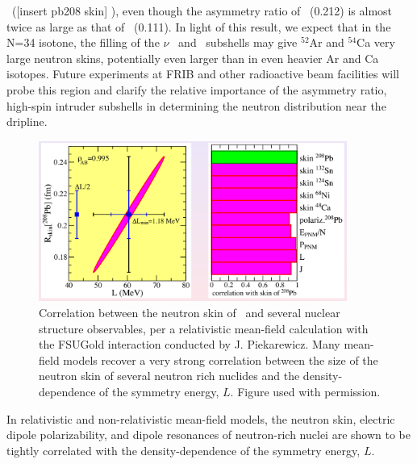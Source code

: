 \pbEight\ ([insert pb208 skin] \femto\meter), even though the asymmetry ratio of \pbEight\
(0.212) is almost twice as large as that of \oEight\ (0.111). In light of this
result, we expect that in the N=34 isotone, the filling of the $\nu$ \fSeven\ and \fFive\ subshells
may give $^{52}$Ar and $^{54}$Ca very large neutron skins, potentially even
larger than in even heavier Ar and Ca isotopes. Future experiments at FRIB and other
radioactive beam facilities will probe this region and clarify the relative
importance of the asymmetry ratio, high-spin intruder subshells in determining
the neutron distribution near the dripline.
\begin{figure}[tb]
    \centering
    \includegraphics[width=0.9\textwidth]{figures/PiekarewiczPb208SkinCorrelation.png}
    \caption[Correlation between the neutron skin of \pbEight\ and several nuclear structure
    observables]
    {
        Correlation between the neutron skin of \pbEight\ and several nuclear structure observables,
        per a relativistic mean-field calculation with the FSUGold interaction
        conducted by J. Piekarewicz. Many
        mean-field models recover a very strong correlation between the size of the
        neutron skin of several neutron rich nuclides and the density-dependence of the symmetry
        energy, $L$. Figure used with permission.
    }
    \label{ParametersObservables}
\end{figure}
In relativistic and non-relativistic mean-field models, the neutron skin,
electric dipole polarizability, and dipole resonances of neutron-rich nuclei are
shown to be tightly correlated with the density-dependence of the symmetry
energy, $L$.
